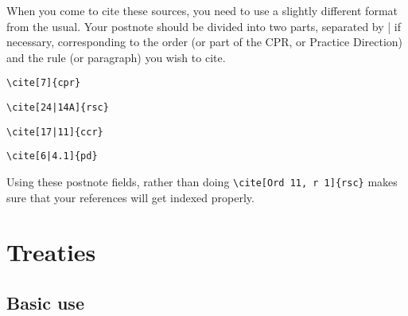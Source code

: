 \documentclass[a4paper,
               11pt,
	       DIV=1,			   
	       footinclude=false]
	      {scrartcl}
\newcommand{\egcite}[1]{{\texttt{\textbackslash cite#1}}}
\begin{document}
When you come to cite these sources, you need to use a slightly
different format from the usual. Your postnote should be divided into
two parts, separated by | if necessary, corresponding to the order (or
part of the CPR, or Practice Direction) and the rule (or paragraph)
you wish to cite.

\begin{description}
\item[\egcite{[7]\{cpr\}}] \cite[7]{cpr}
\item[\egcite{[24|14A]\{rsc\}}] \cite[24|14A]{rsc}
\item[\egcite{[17|11]\{ccr\}}] \cite[17|11]{ccr}
\item[\egcite{[6|4.1]\{pd\}}] \cite[6|4.1]{pd}
\end{description}

Using these postnote fields, rather than doing
\verb|\cite[Ord 11, r 1]{rsc}| makes sure that your references will
get indexed properly.


\section{Treaties\label{piltreaties}}

\subsection{Basic use}
\end{document}
